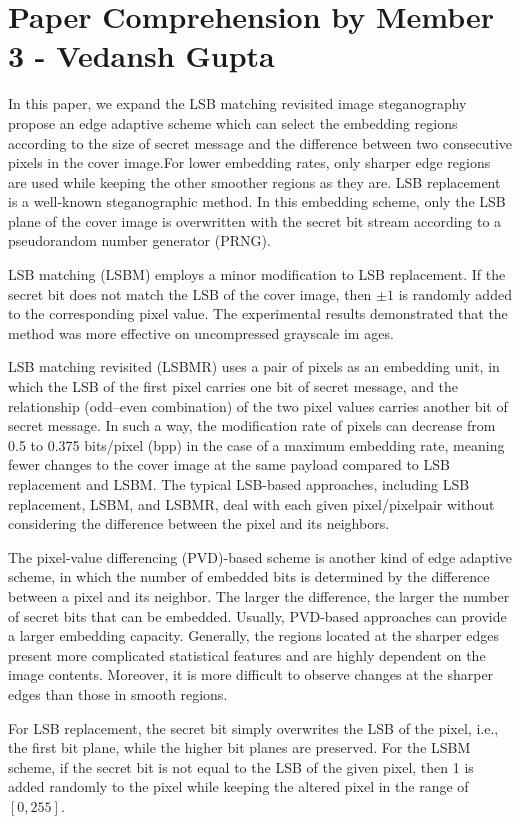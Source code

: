 \documentclass{report}
\begin{document}
\newpage
\section{Paper Comprehension by Member 3 - Vedansh Gupta}
In this
paper, we expand the LSB matching revisited image steganography propose an edge adaptive scheme which can select the
embedding regions according to the size of secret message and the difference between two consecutive pixels in the cover image.For lower embedding rates, only sharper edge regions are used while keeping the other smoother regions as they are.
LSB replacement is a well-known steganographic method. In
this embedding scheme, only the LSB plane of the cover image
is overwritten with the secret bit stream according to a pseudorandom
number generator (PRNG). \par LSB matching (LSBM) employs a minor modification to LSB
replacement. If the secret bit does not match the LSB of the
cover image, then $\pm 1$ is randomly added to the corresponding
pixel value. The experimental results demonstrated that
the method was more effective on uncompressed grayscale im
ages. \par LSB matching revisited (LSBMR) uses a pair of pixels as an embedding unit, in which the LSB
of the first pixel carries one bit of secret message, and the relationship
(odd–even combination) of the two pixel values carries
another bit of secret message. In such a way, the modification
rate of pixels can decrease from 0.5 to 0.375 bits/pixel
(bpp) in the case of a maximum embedding rate, meaning fewer
changes to the cover image at the same payload compared to
LSB replacement and LSBM. The typical LSB-based approaches, including LSB replacement,
LSBM, and LSBMR, deal with each given pixel/pixelpair
without considering the difference between the pixel and
its neighbors. \par The pixel-value differencing (PVD)-based scheme
 is another kind of edge adaptive scheme, in
which the number of embedded bits is determined by the difference
between a pixel and its neighbor. The larger the difference,
the larger the number of secret bits that can be embedded.
Usually, PVD-based approaches can provide a larger
embedding capacity. Generally, the regions
located at the sharper edges present more complicated statistical
features and are highly dependent on the image contents.
Moreover, it is more difficult to observe changes at the sharper
edges than those in smooth regions. \par For LSB replacement, the secret bit
simply overwrites the LSB of the pixel, i.e., the first bit plane,
while the higher bit planes
are preserved. For the LSBM
scheme, if the secret bit is not equal to the LSB of the given
pixel, then
1 is added randomly to the pixel while keeping the
altered pixel in the range of $[0, 255]$. 
\end{document}
